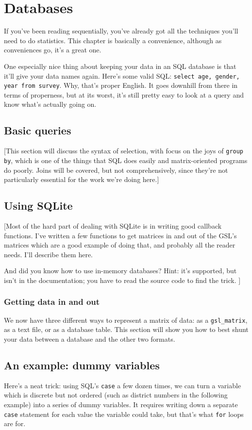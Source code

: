 \chapter{Databases} \label{sql}

If you've been reading sequentially, you've already got all the techniques you'll need to do statistics.
This chapter is basically a convenience, although as conveniences go, it's a great one. 

One especially nice thing about keeping your data in an SQL database is
that it'll give your data names again. Here's some valid SQL: {\tt select age, gender, year from
survey}. Why, that's proper English. It goes downhill from there in terms of properness, but at its worst,
it's still pretty easy to look at a query and know what's actually going on.

\section{Basic queries}
[This section will discuss the syntax of selection, with focus on the joys of {\tt group by}, which is
one of the things that SQL does easily and matrix-oriented programs do poorly. Joins will be covered,
but not comprehensively, since they're not particularly essential for the work we're doing here.]

\section{Using SQLite}

[Most of the hard part of dealing with SQLite is in writing good callback
functions.  I've written a few functions to get matrices in and out of
the GSL's matrices which are a good example of doing that, and probably
all the reader needs. I'll describe them here.

And did you know how to use in-memory databases? Hint: it's supported,
but isn't in the documentation; you have to read the source code
to find the trick. ]

\subsection{Getting data in and out}
We now have three different ways to represent a matrix of data: as a {\tt gsl\_matrix}, as a text file,
or as a database table. This section will show you how to best shunt your data between a database and
the other two formats.

\section{An example: dummy variables}
Here's a neat trick: using SQL's {\tt case} a few dozen times, we can turn a
variable which is discrete but not ordered (such as district numbers in the
following example) into a series of dummy variables. It requires writing down a
separate {\tt case} statement for each value the variable could take, but that's
what {\tt for} loops are for.

